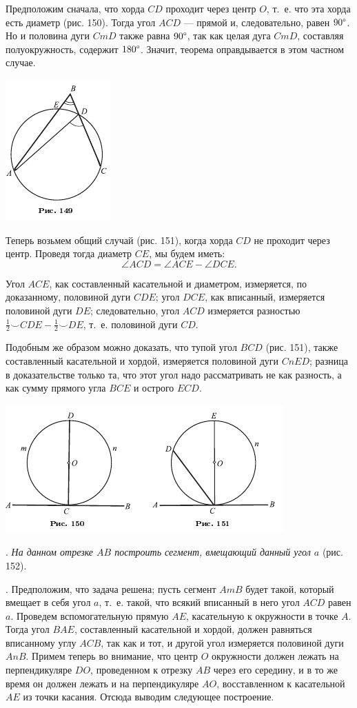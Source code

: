 \documentclass[oneside]{book}
\begin{document}
Предположим сначала, что хорда $CD$ проходит через центр $O$, т.~е. что эта хорда есть диаметр (рис. 150).
Тогда угол $ACD$ — прямой и,
следовательно, равен $90\degree$.
Но и половина дуги $CmD$ также равна $90\degree$, так как целая дуга $CmD$, составляя полуокружность, содержит $180\degree$.
Значит, теорема оправдывается в этом частном случае.

\includegraphics{pics/ris-149}

Теперь возьмем общий случай (рис. 151), когда хорда $CD$ не проходит через центр.
Проведя тогда диаметр $CE$, мы будем иметь:
\[\angle ACD = \angle ACE - \angle DCE.\]

Угол $ACE$, как составленный касательной и диаметром, измеряется, по доказанному, половиной дуги $CDE$;
угол $DCE$, как вписанный, измеряется половиной дуги $DE$;
следовательно, угол $ACD$ измеряется разностью $\tfrac12{\smallsmile}CDE-\tfrac12{\smallsmile}DE$, т.~е. половиной дуги $CD$.

Подобным же образом можно доказать, что тупой угол $BCD$ (рис. 151), также составленный касательной и хордой, измеряется половиной дуги $CnED$;
разница в доказательстве только та, что этот угол надо рассматривать не как разность, а как сумму прямого угла $BCE$ и острого $ECD$.

\includegraphics{pics/ris-150-151}

.
\emph{На данном отрезке $AB$ построить сегмент, вмещающий данный угол $a$} (рис. 152).

.
Предположим, что задача решена;
пусть сегмент $AmB$ будет такой, который вмещает в себя угол $a$, т.~е. такой, что всякий вписанный в него угол $ACD$ равен $a$.
Проведем вспомогательную прямую $AE$, касательную к окружности в точке $A$.
Тогда угол $BAE$, составленный касательной и хордой, должен равняться вписанному углу $ACB$, так как и тот, и другой угол измеряется половиной дуги $AnB$.
Примем теперь во внимание, что центр $O$ окружности должен лежать на перпендикуляре $DO$, проведенном к отрезку $AB$ через его середину, и в то же время он должен лежать и на перпендикуляре $AO$, восставленном к касательной $AE$ из точки касания.
Отсюда выводим следующее построение.
\end{document}
